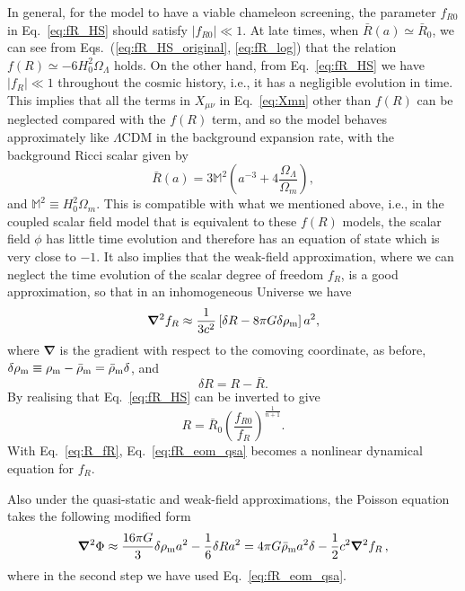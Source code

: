 In general, for the model to have a viable chameleon screening, the parameter $f_{R0}$ in Eq.~\eqref{eq:fR_HS} should satisfy $|f_{R0}|\ll1$. At late times, when $\bar{R}(a)\simeq\bar{R}_0$, we can see from Eqs.~(\ref{eq:fR_HS_original}, \ref{eq:fR_log}) that the relation $f(R)\simeq-6H_0^2\Omega_\Lambda$ holds. On the other hand, from Eq.~\eqref{eq:fR_HS} we have $|f_R|\ll1$ throughout the cosmic history, i.e., it has a negligible evolution in time. This implies that all the terms in $X_{\mu\nu}$ in Eq.~\eqref{eq:Xmn} other than $f(R)$ can be neglected compared with the $f(R)$ term, and so the model behaves approximately like $\Lambda$CDM in the background expansion rate, with the background Ricci scalar given by
\begin{equation}\label{eq:R_bar}
    \bar{R}(a) = 3\mathbb{M}^2\left(a^{-3}+4\frac{\Omega_\Lambda}{\Omega_m}\right),
\end{equation}
and $\mathbb{M}^2\equiv{H}_0^2\Omega_m$. This is compatible with what we mentioned above, i.e., in the coupled scalar field model that is equivalent to these $f(R)$ models, the scalar field $\phi$ has little time evolution and therefore has an equation of state which is very close to $-1$. It also implies that the weak-field approximation, where we can neglect the time evolution of the scalar degree of freedom $f_R$, is a good approximation, so that in an inhomogeneous Universe we have
\begin{equation}\label{eq:fR_eom_qsa}
    \boldsymbol{\nabla}^2f_R \approx \frac{1}{3c^2}\left[\delta R-8\pi G\delta\rho_{\rm m}\right]a^2,
\end{equation}
where $\boldsymbol{\nabla}$ is the gradient with respect to the comoving coordinate, as before, $\delta\rho_{\rm m}\equiv\rho_{\rm m}-\bar{\rho}_{\rm m}=\bar{\rho}_{\rm m}\delta$, and 
\begin{equation}
    \delta R = R - \bar{R}.
\end{equation}
By realising that Eq.~\eqref{eq:fR_HS} can be inverted to give
\begin{equation}\label{eq:R_fR}
    R = \bar{R}_0\left(\frac{f_{R0}}{f_R}\right)^{\frac{1}{n+1}}.
\end{equation}
With Eq.~\eqref{eq:R_fR}, Eq.~\eqref{eq:fR_eom_qsa} becomes a nonlinear dynamical equation for $f_R$. 

Also under the quasi-static and weak-field approximations, the Poisson equation takes the following modified form
\begin{equation}\label{eq:fR_Poisson_qsa}
    \boldsymbol{\nabla}^2\Phi \approx \frac{16\pi{G}}{3}\delta\rho_{\rm m}a^2 - \frac{1}{6}\delta{R}a^2 = 
    4\pi{G} \bar{\rho}_{\rm m} a^2 \delta - \frac{1}{2} c^2\boldsymbol{\nabla}^2 f_R \,,
\end{equation}
where in the second step we have used Eq.~\eqref{eq:fR_eom_qsa}.

